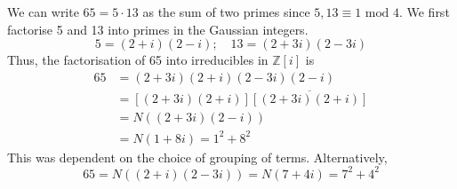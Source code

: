 \begin{example}
	We can write \( 65 = 5 \cdot 13 \) as the sum of two primes since \( 5, 13 \equiv 1 \text{ mod } 4 \).
	We first factorise 5 and 13 into primes in the Gaussian integers.
	\[
		5 = (2+i)(2-i);\quad 13 = (2+3i)(2-3i)
	\]
	Thus, the factorisation of 65 into irreducibles in \( \mathbb Z[i] \) is
	\begin{align*}
		65 & = (2+3i)(2+i)(2-3i)(2-i)                \\
		   & = [(2+3i)(2+i)]\overline{[(2+3i)(2+i)]} \\
		   & = N((2+3i)(2-i))                        \\
		   & = N(1+8i) = 1^2 + 8^2
	\end{align*}
	This was dependent on the choice of grouping of terms.
	Alternatively,
	\[
		65 = N((2+i)(2-3i)) = N(7+4i) = 7^2 + 4^2
	\]
\end{example}

